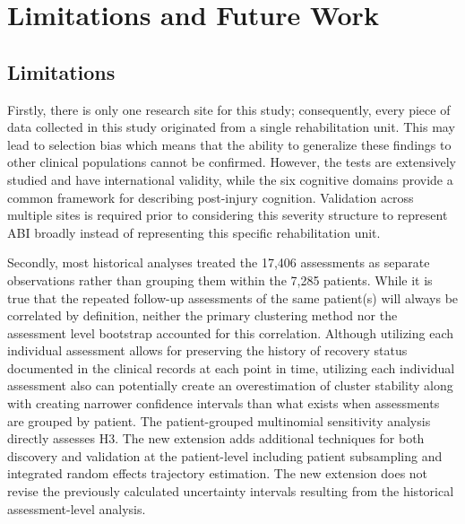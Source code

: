 
\chapter{Limitations and Future Work}\label{Chapter6}


\section{Limitations}\label{sec:limits}
Firstly, there is only one research site for this study; consequently, every piece of data collected in this study originated from a single rehabilitation unit. This may lead to selection bias which means that the ability to generalize these findings to other clinical populations cannot be confirmed. However, the tests are extensively studied and have international validity, while the six cognitive domains provide a common framework for describing post-injury cognition. Validation across multiple sites is required prior to considering this severity structure to represent ABI broadly instead of representing this specific rehabilitation unit.

Secondly, most historical analyses treated the 17,406 assessments as separate observations rather than grouping them within the 7,285 patients. While it is true that the repeated follow-up assessments of the same patient(s) will always be correlated by definition, neither the primary clustering method nor the assessment level bootstrap accounted for this correlation. Although utilizing each individual assessment allows for preserving the history of recovery status documented in the clinical records at each point in time, utilizing each individual assessment also can potentially create an overestimation of cluster stability along with creating narrower confidence intervals than what exists when assessments are grouped by patient. The patient-grouped multinomial sensitivity analysis directly assesses H3. The new extension adds additional techniques for both discovery and validation at the patient-level including patient subsampling and integrated random effects trajectory estimation. The new extension does not revise the previously calculated uncertainty intervals resulting from the historical assessment-level analysis.

